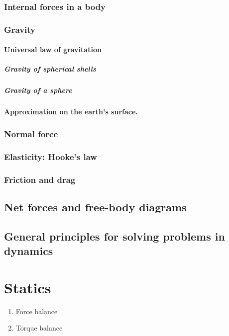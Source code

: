\subsection{Internal forces in a body}
\subsection{Gravity}
\subsubsection{Universal law of gravitation}
\paragraph{Gravity of spherical shells}
\paragraph{Gravity of a sphere}
\subsubsection{Approximation on the earth's surface.}
\subsection{Normal force}
\subsection{Elasticity: Hooke's law}
\subsection{Friction and drag}
\section{Net forces and free-body diagrams}
\section{General principles for solving problems in dynamics}

\chapter{Statics}
\begin{enumerate}
\item Force balance
\item Torque balance
\end{enumerate}

